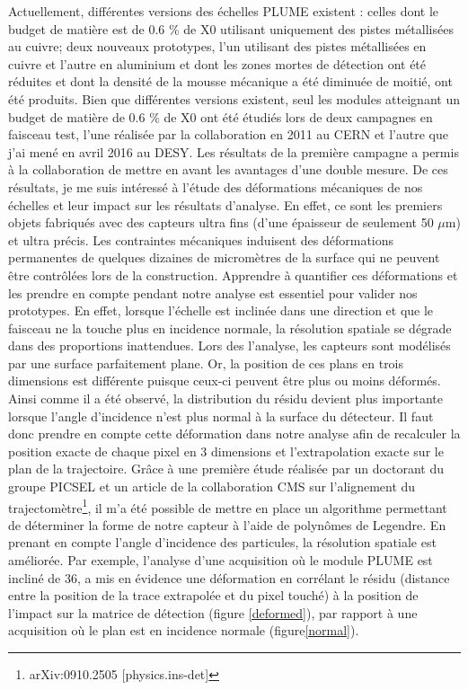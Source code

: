 \documentclass[a4papper, 10pt]{article}
\begin{document}
  Actuellement, différentes versions des échelles PLUME existent : celles dont le budget de matière est de 0.6 \% de X0 utilisant uniquement des pistes métallisées au cuivre; deux nouveaux prototypes, l'un utilisant des pistes métallisées en cuivre et l'autre en aluminium et dont les zones mortes de détection ont été réduites et dont la densité de la mousse mécanique a été diminuée de moitié, ont été produits.
  Bien que différentes versions existent, seul les modules atteignant un budget de matière de 0.6 \% de X0 ont été étudiés lors de deux campagnes en faisceau test, l'une réalisée par la collaboration en 2011 au CERN et l'autre que j'ai mené en avril 2016 au DESY.
  Les résultats de la première campagne a permis à la collaboration de mettre en avant les avantages d'une double mesure. 
  De ces résultats, je me suis intéressé à l'étude des déformations mécaniques de nos échelles et leur impact sur les résultats d'analyse.
  En effet, ce sont les premiers objets fabriqués avec des capteurs ultra fins (d'une épaisseur de seulement 50 $\mu$m) et ultra précis. 
  Les contraintes mécaniques induisent des déformations permanentes de quelques dizaines de micromètres de la surface qui ne peuvent être contrôlées lors de la construction.
  Apprendre à quantifier ces déformations et les prendre en compte pendant notre analyse est essentiel pour valider nos prototypes.
  En effet, lorsque l'échelle est inclinée dans une direction et que le faisceau ne la touche plus en incidence normale, la résolution spatiale se dégrade dans des proportions inattendues.
  Lors des l'analyse, les capteurs sont modélisés par une surface parfaitement plane.
  Or, la position de ces plans en trois dimensions est différente puisque ceux-ci peuvent être plus ou moins déformés.
  Ainsi comme il a été observé, la distribution du résidu devient plus importante lorsque l'angle d'incidence n'est plus normal à la surface du détecteur.
  Il faut donc prendre en compte cette déformation dans notre analyse afin de recalculer la position exacte de chaque pixel en 3 dimensions et l'extrapolation exacte sur le plan de la trajectoire. 
  Grâce à une première étude réalisée par un doctorant du groupe PICSEL et un article de la collaboration CMS sur l'alignement du trajectomètre\footnote{arXiv:0910.2505 [physics.ins-det]}, il m'a été possible de mettre en place un algorithme permettant de déterminer la forme de notre capteur à l'aide de polynômes de Legendre. 
  En prenant en compte l'angle d'incidence des particules, la résolution spatiale est améliorée. 
  Par exemple, l'analyse d'une acquisition où le module PLUME est incliné de 36\degre, a mis en évidence une déformation en corrélant le résidu (distance entre la position de la trace extrapolée et du pixel touché) à la position de l'impact sur la matrice de détection (figure \ref{deformed}), par rapport à une acquisition où le plan est en incidence normale (figure\ref{normal}).
\end{document}
